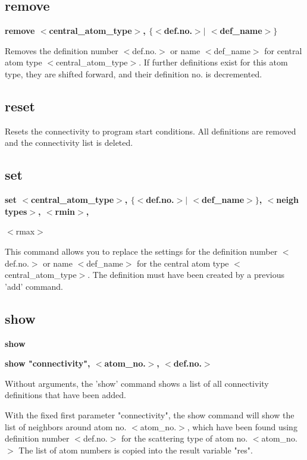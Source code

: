\subsection*{remove}
{\bf remove $ <$central\_atom\_type$> $, $ \{$$ <$def.no.$> $$| $ $ <$def\_name$> $$\} $ \par }
\par
\vspace{3pt}
Removes the definition number $ <$def.no.$> $ or name $ <$def\_name$> $ for 
central atom type $ <$central\_atom\_type$> $. 
If further definitions exist for this atom type, they are shifted 
forward, and their definition no. is decremented. 
\subsection*{reset}
\par
Resets the connectivity to program start conditions. 
All definitions are removed and the connectivity list is deleted. 
\subsection*{set}
{\bf set $ <$central\_atom\_type$> $, $ \{$$ <$def.no.$> $$| $ $ <$def\_name$> $$\} $, $ <$neigh types$> $, $ <$rmin$> $, \par }
\vspace{3pt}
                                                                 $ <$rmax$> $ 
\par
This command allows you to replace the settings for the definition 
number $ <$def.no.$> $ or name $ <$def\_name$> $ for the central atom type 
$ <$central\_atom\_type$> $. 
The definition must have been created by a previous 'add' command. 
\subsection*{show}
{\bf show \par }
{\bf show "connectivity", $ <$atom\_no.$> $, $ <$def.no.$> $ \par }
\par
\vspace{3pt}
Without arguments, the 'show' command shows a list of all 
connectivity definitions that have been added. 
\par
With the fixed first parameter "connectivity", the show command will 
show the list of neighbors around atom no. $ <$atom\_no.$> $, which have 
been found using definition number $ <$def.no.$> $ for the scattering 
type of atom no. $ <$atom\_no.$> $ 
The list of atom numbers is copied into the result variable "res". 
